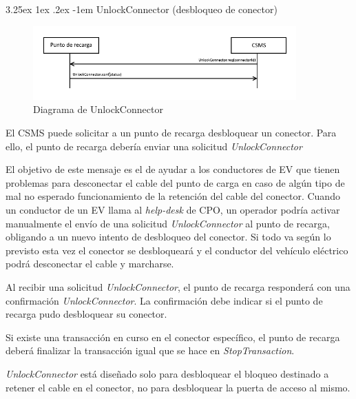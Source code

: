 \documentclass[12pt,a4paper,onecolumn,oneside]{report}
\makeatletter
\renewcommand\paragraph{\@startsection{paragraph}{5}{\z@}%
  {3.25ex \@plus1ex \@minus.2ex}%
  {-1em}%
  {\normalfont\normalsize\bfseries}}
\makeatother
\begin{document}
\paragraph{UnlockConnector (desbloqueo de conector)}
\label{UnlockConnector (desbloqueo de conector)}


\begin{figure}[H] 
\centering
  \includegraphics[width=0.9\textwidth]{figuras/diagramaunlockconnector.png}
  \caption[Diagrama de \textit{UnlockConnector}]{Diagrama de UnlockConnector\\
  }
  \label{fig:diagramaunlockconnector}
\end{figure}


El CSMS puede solicitar a un punto de recarga desbloquear un conector. Para ello, el punto de recarga debería enviar una solicitud \textit{UnlockConnector}

El objetivo de este mensaje es el de ayudar a los conductores de EV que tienen problemas para desconectar el cable del punto de carga en caso de algún tipo de mal  no esperado funcionamiento de la retención del cable del conector. Cuando un conductor de un EV llama al \textit{help-desk} de CPO, un operador podría activar manualmente el envío de una solicitud \textit{UnlockConnector} al punto de recarga, obligando a un nuevo intento de desbloqueo del conector. Si todo va según lo previsto esta vez el conector se desbloqueará y el conductor del vehículo eléctrico podrá desconectar el cable y marcharse.

Al recibir una solicitud \textit{UnlockConnector}, el punto de recarga responderá con una confirmación \textit{UnlockConnector}. La confirmación debe indicar si el punto de recarga pudo desbloquear su conector. 

Si existe una transacción en curso en el conector específico, el punto de recarga deberá finalizar la transacción igual que se hace en \textit{StopTransaction}.

\textit{UnlockConnector} está diseñado solo para desbloquear el bloqueo destinado a retener el cable en el conector, no para desbloquear la puerta de acceso al mismo.
\end{document}
